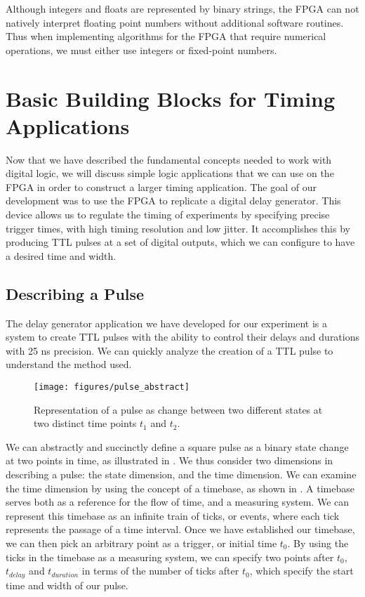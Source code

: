 Although integers and floats are represented by binary strings, the FPGA can
not natively interpret floating point numbers without additional software routines.  Thus when implementing algorithms for the FPGA that require numerical operations, we must either use integers or fixed-point numbers.

\section{Basic Building Blocks for Timing Applications}

Now that we have described the fundamental concepts needed to work with digital logic, we will discuss simple logic applications that we can use on the FPGA in order to construct a larger timing application.  The goal of our development was to use the FPGA to replicate a digital delay generator.  This device allows us to regulate the timing of experiments by specifying precise trigger times, with high timing resolution and low jitter.  It accomplishes this by producing TTL pulses at a set of digital outputs, which we can configure to have a desired time and width.



\subsection{Describing a Pulse}
\label{describing_a_pulse} 

The delay generator application we have developed for our experiment is a system
to create TTL pulses with the ability to control their delays and durations with 25 ns  precision.  We can quickly analyze the creation of a TTL pulse to understand the method used.

\begin{figure}[!ht] 
 \centering 
 \texttt{[image: figures/pulse\_abstract]} 
 \caption[Abstract Representation Of a Pulse]{Representation of a pulse as change between two different states at two distinct time points $t_1$ and $t_2$.} 
 \label{fig:pulse_abstract} 
\end{figure}

We can abstractly and succinctly define a square pulse as a binary state
change at two points in time, as illustrated in .  We thus consider two dimensions in describing a
pulse: the state dimension, and the time dimension.  We can examine the time
dimension by using the concept of a timebase, as shown in .  A timebase serves both as a
reference for the flow of time, and a measuring system.  We can represent this
timebase as an infinite train of ticks, or events, where each tick represents
the passage of a time interval.  Once we have established our timebase, we can then pick an arbitrary point as a trigger, or initial time $t_0$.  By using the ticks in the timebase as a measuring system, we can specify two points after $t_0$, $t_{delay}$ and $t_{duration}$ in terms of the number of ticks after $t_0$, which specify the start time and width of our pulse.

